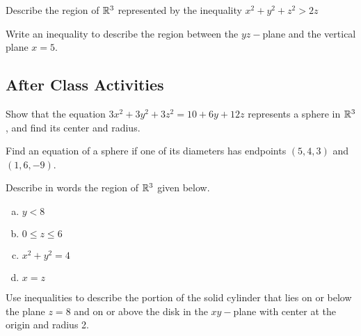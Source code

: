 \documentclass[notes]{subfiles}
\begin{document}
		\begin{ex}
			Describe the region of $\mathbb{R}^3$ represented by the inequality $x^2 + y^2 + z^2 > 2z$
		\end{ex}
			
		\begin{ex}
			Write an inequality to describe the region between the $yz-$plane and the vertical plane $x = 5$.
		\end{ex}
			\newpage
			
	\subsection*{After Class Activities}
		\begin{ex}
			Show that the equation $3x^2 + 3y^2 + 3z^2 = 10 + 6y + 12z$ represents a sphere in $\mathbb{R}^3$, and find its center and radius.
		\end{ex}
			
		\begin{ex}
			Find an equation of a sphere if one of its diameters has endpoints $(5,4,3)$ and $(1,6,-9)$.
		\end{ex}
			
		\begin{ex}
			Describe in words the region of $\mathbb{R}^3$ given below.
			\begin{enumerate}[(a)]
				\item $y  < 8$
					
				\item $0\leq z\leq 6$
					
				\item $x^2 + y^2 = 4$
					
				\item $x = z$
			\end{enumerate}
		\end{ex}
		
		\begin{ex}
			Use inequalities to describe the portion of the solid cylinder that lies on or below the plane $z = 8$ and on or above the disk in the $xy-$plane with center at the origin and radius 2.
		\end{ex}
\clearpage
\end{document}
